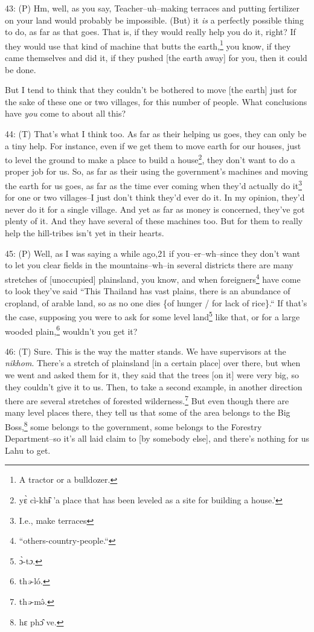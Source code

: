 43: (P) Hm, well, as you say, Teacher--uh--making terraces and putting fertilizer
on your land would probably be impossible. (But) it \textit{is} a perfectly possible
thing to do, as far as that goes. That is, if they would really help you do it,
right? If they would use that kind of machine that butts the earth,\footnote{A tractor or a bulldozer.} you know,
if they came themselves and did it, if they pushed [the earth away] for you, then
it could be done.

But I tend to think that they couldn't be bothered to move [the earth] just for
the sake of these one or two villages, for this number of people. What conclusions
have \textit{you} come to about all this?

44: (T) That's what I think too. As far as their helping us goes, they can only
be a tiny help. For instance, even if we get them to move earth for our houses,
just to level the ground to make a place to build a house\footnote{yɛ̀ cì-khɨ̂ 'a place that has been leveled as a site for building a house.'}, they don't want
to do a proper job for us. So, as far as their using the government's machines
and moving the earth for us goes, as far as the time ever coming when they'd actually
do it\footnote{I.e., make terraces} for one or two villages--I just don't think they'd ever do it. In my
opinion, they'd never do it for a single village. And yet as far as money is concerned,
they've got plenty of it. And they have several of these machines too. But for
them to really help the hill-tribes isn't yet in their hearts.

45: (P) Well, as I was saying a while ago,21 if you--er--wh--since they don't want
to let you clear fields in the mountains--wh--in several districts there are many
stretches of [unoccupied] plainsland, you know, and when foreigners\footnote{``others-country-people.``} have come
to look they've said ``This Thailand has vast plains, there is an abundance
of cropland, of arable land, so as no one dies \{of hunger / for lack of rice\}.``
If that's the case, supposing you were to ask for some level land\footnote{ɔ̀-t\emph{ɔ}.} like that,
or for a large wooded plain,\footnote{th\emph{ə}-ló.} wouldn't you get it?

46: (T) Sure. This is the way the matter stands. We have supervisors at the \textit{nikhom}.
There's a stretch of plainsland [in a certain place] over there, but when we went
and asked them for it, they said that the trees [on it] were very big, so they
couldn't give it to us. Then, to take a second example, in another direction there
are several stretches of forested wilderness.\footnote{th\emph{ə}-mə̂.} But even though there are many
level places there, they tell us that some of the area belongs to the Big Boss,\footnote{hɛ phɔ̂ ve.}
some belongs to the government, some belongs to the Forestry Department--so it's
all laid claim to [by somebody else], and there's nothing for us Lahu to get.


